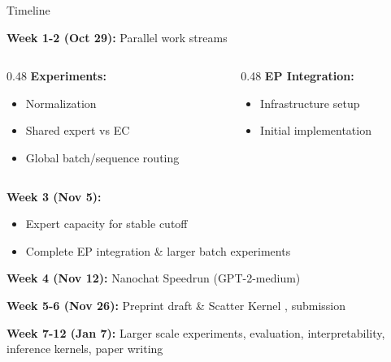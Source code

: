 \documentclass{beamer}
\begin{document}
\begin{frame}{Timeline}

\textbf{Week 1-2 (Oct 29):} Parallel work streams
\begin{columns}[t]
\begin{column}{0.48\textwidth}
\textbf{Experiments:}
\begin{itemize}
    \item Normalization
    \item Shared expert vs EC
    \item Global batch/sequence routing
\end{itemize}
\end{column}

\begin{column}{0.48\textwidth}
\textbf{EP Integration:}
\begin{itemize}
    \item Infrastructure setup
    \item Initial implementation
\end{itemize}
\end{column}
\end{columns}

\vspace{0.3cm}

\textbf{Week 3 (Nov 5):}
\begin{itemize}
    \item Expert capacity for stable cutoff
    \item Complete EP integration \& larger batch experiments
\end{itemize}

\textbf{Week 4 (Nov 12):} Nanochat Speedrun (GPT-2-medium) \checkmark

\vspace{0.1cm}

\textbf{Week 5-6 (Nov 26):} Preprint draft \& Scatter Kernel \checkmark, submission

\vspace{0.1cm}

\textbf{Week 7-12 (Jan 7):} Larger scale experiments, evaluation, interpretability, inference kernels, paper writing

\end{frame}
\end{document}
